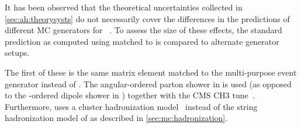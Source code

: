 It has been observed that the theoretical uncertainties collected in \cref{sec:ah:theorysysts} do not necessarily cover the differences in the predictions of different MC generators for \ttbar~\cite{ATLAS:2018ivx,CMS:TOP-17-002,CMS:TOP-23-001,ATLAS:2023fsd}. To assess the size of these effects, the standard \ttbar prediction as computed using \powheg \hvq matched to \pythia is compared to alternate generator setups.%


The first of these is the same \powheg \hvq matrix element matched to the multi-purpose event generator \herwig instead of \pythia. The angular-ordered parton shower in \herwig is used (as opposed to the \pt-ordered dipole shower in \pythia) together with the CMS CH3 tune~\cite{CMS:GEN-19-001}. Furthermore, \herwig uses a cluster hadronization model~\cite{Webber:1983if} instead of the string hadronization model of \pythia as described in \cref{sec:mc:hadronization}.

